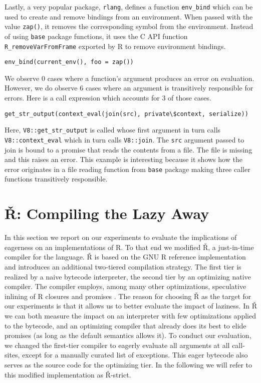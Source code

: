 \documentclass[review,nonacm,screen,acmsmall,anonymous=true]{acmart}
\newcommand{\authorcomment}[3]{}
\newcommand{\AG}[1]{\authorcomment{orange}{AG}{#1}}
\newcommand{\code}[1]{\lstinline |#1|\xspace}
\renewcommand{\Rsh}{{\sf\v R}\xspace}
\newcommand{\Rshstrict}{{\sf\v R-strict}\xspace}
\begin{document}
Lastly, a very popular package, \code{rlang}, defines a function \code{env_bind}
which can be used to create and remove bindings from an environment. When passed
with the value \code{zap()}, it removes the corresponding symbol from the
environment. Instead of using \code{base} package functions, it uses the C API
function \code{R_removeVarFromFrame} exported by R to remove environment
bindings.
%
\begin{lstlisting}
env_bind(current_env(), foo = zap())
\end{lstlisting}
%
We observe 0 cases where a function's argument produces an error on evaluation.
However, we do observe 6 cases where an argument is transitively responsible for
errors. Here is a call expression which accounts for 3 of those cases.
%
\begin{lstlisting}
get_str_output(context_eval(join(src), private\$context, serialize))
\end{lstlisting}
%
Here, \code{V8::get_str_output} is called whose first argument in turn calls
\code{V8::context_eval} which in turn calls \code{V8::join}. The \code{src}
argument passed to join is bound to a promise that reads the contents from a
file. The file is missing and this raises an error. This example is interesting
because it shows how the error originates in a file reading function from
\code{base} package making three caller functions transitively responsible.

\AG{TODO: appeal to intuition for lookups since the actual examples are hard to decipher.}

\section{\Rsh: Compiling the Lazy Away}\label{sec:rsh}

In this section we report on our experiments to evaluate the implications of
eagerness on an implementations of R. To that end we modified \Rsh, a just-in-time
compiler for the language. \Rsh is based on the GNU R reference implementation
and introduces an additional two-tiered compilation strategy. The
first tier is realized by a naive bytecode interpreter, the second tier
by an optimizing native compiler. The compiler employs, among many other
optimizations, speculative inlining of R closures and promises \citep{dls19,
oopsla20c}.
The reason for choosing \Rsh as the target for our
experiments is that it allows us to better evaluate the impact of laziness. In
\Rsh we can both measure the impact on an interpreter with few optimizations
applied to the bytecode, and an optimizing compiler that already does its best
to elide promises (as long as the default semantics allows it).
To conduct our evaluation, we changed the first-tier
compiler to eagerly evaluate all arguments at all call-sites, except for a
manually curated list of exceptions. This eager bytecode also serves as the source
code for the optimizing tier. In the following we will refer
to this modified implementation as \Rshstrict.
\end{document}
